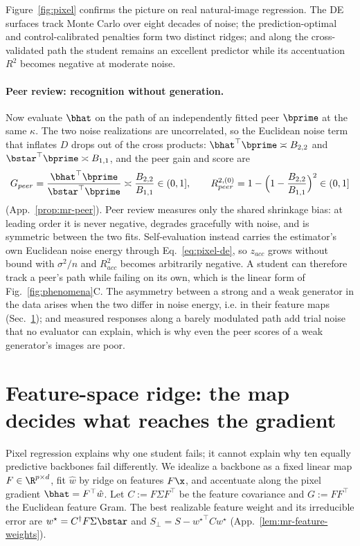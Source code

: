 Figure~\ref{fig:pixel} confirms the picture on real natural-image regression. The DE surfaces track Monte Carlo over eight decades of noise; the prediction-optimal and control-calibrated penalties form two distinct ridges; and along the cross-validated path the student remains an excellent predictor while its accentuation $R^2$ becomes negative at moderate noise. 

\paragraph{Peer review: recognition without generation.}
Now evaluate $\bhat$ on the path of an independently fitted peer $\bprime$ at the same $\kappa$. The two noise realizations are uncorrelated, so the Euclidean noise term that inflates $D$ drops out of the cross products: ${\bhat}^\top\bprime\asymp B_{2,2}$ and ${\bstar}^\top\bprime\asymp B_{1,1}$, and the peer gain and score are
\begin{equation}
G_{peer}=\frac{{\bhat}^\top\bprime}{{\bstar}^\top\bprime}\asymp\frac{B_{2,2}}{B_{1,1}}\in(0,1],
\qquad
R^{2,(0)}_{peer}=1-\Big(1-\frac{B_{2,2}}{B_{1,1}}\Big)^2\in(0,1]
\label{eq:peer-de}
\end{equation}
(App.~\ref{prop:mr-peer}). Peer review measures only the shared shrinkage bias: at leading order it is never negative, degrades gracefully with noise, and is symmetric between the two fits. Self-evaluation instead carries the estimator's own Euclidean noise energy through Eq.~\ref{eq:pixel-de}, so $z_{acc}$ grows without bound with $\sigma^2/n$ and $R^2_{acc}$ becomes arbitrarily negative. A student can therefore track a peer's path while failing on its own, which is the linear form of Fig.~\ref{fig:phenomena}C. The asymmetry between a strong and a weak generator in the data arises when the two differ in noise energy, i.e. in their feature maps (Sec.~\ref{sec:feature}); and measured responses along a barely modulated path add trial noise that no evaluator can explain, which is why even the peer scores of a weak generator's images are poor.

\section{Feature-space ridge: the map decides what reaches the gradient}
\label{sec:feature}

Pixel regression explains why one student fails; it cannot explain why ten equally predictive backbones fail differently. We idealize a backbone as a fixed linear map $F\in\R^{p\times d}$, fit $\hat w$ by ridge on features $F\x$, and accentuate along the pixel gradient $\bhat=F^\top\hat w$. Let $C:=F\Sigma F^\top$ be the feature covariance and $G:=FF^\top$ the Euclidean feature Gram. The best realizable feature weight and its irreducible error are $w^\star=C^\dagger F\Sigma\bstar$ and $S_\perp=S-{w^\star}^\top Cw^\star$ (App.~\ref{lem:mr-feature-weights}).

